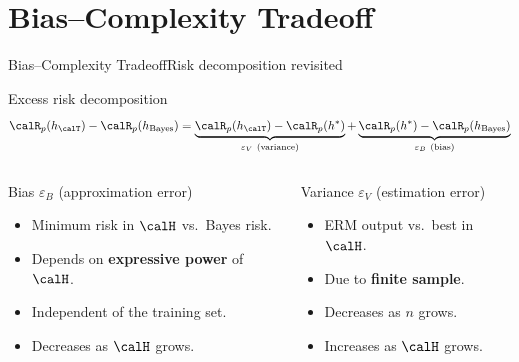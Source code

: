 \section{Bias--Complexity Tradeoff}

\begin{frame}{Bias–Complexity Tradeoff}{Risk decomposition revisited}
  \begin{block}{Excess risk decomposition}
    \[
      \calR_p(h_\calT) - \calR_p(h_{\text{Bayes}})
      =
      \underbrace{\calR_p(h_\calT) - \calR_p(h^*)}_{\varepsilon_V\ (\text{variance})}
      +
      \underbrace{\calR_p(h^*) - \calR_p(h_{\text{Bayes}})}_{\varepsilon_B\ (\text{bias})}
    \]
  \end{block}
  \bigskip
  \begin{columns}[T]
    \begin{block}{Bias $\varepsilon_B$ (approximation error)}
      \begin{itemize}
        \item Minimum risk in $\calH$ vs.\ Bayes risk.
        \item Depends on \textbf{expressive power} of $\calH$.
        \item Independent of the training set.
        \item Decreases as $\calH$ grows.
      \end{itemize}
    \end{block}
    \begin{block}{Variance $\varepsilon_V$ (estimation error)}
      \begin{itemize}
        \item ERM output vs.\ best in $\calH$.
        \item Due to \textbf{finite sample}.
        \item Decreases as $n$ grows.
        \item Increases as $\calH$ grows.
      \end{itemize}
    \end{block}
  \end{columns}
\end{frame}

